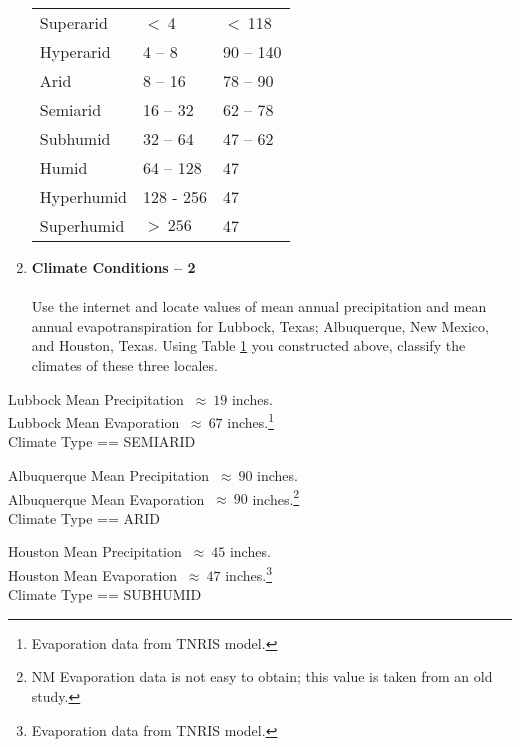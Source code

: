 \documentclass[12pt]{article}
\begin{document}
\begin{enumerate}
\begin{table}[htbp]
\begin{tabular}{p{1.5in}p{2.25in}p{2.25in}}
   Superarid & $<~$4 & $<~$118 \\

   Hyperarid & 4 -- 8  &  90 -- 140  \\
  
   Arid & 8 -- 16 &  78 -- 90 \\

   Semiarid & 16 -- 32 & 62 -- 78 \\

   Subhumid & 32 -- 64 & 47 -- 62 \\

   Humid & 64 -- 128 & 47  \\

   Hyperhumid & 128 - 256 & 47 \\

   Superhumid & $>~256$ & 47 \\

\hline
\hline
   \end{tabular}
   \label{tab:climate}
\end{table}

\item{{\textbf{Climate Conditions -- 2}}}~\\~\\
Use the internet and locate values of mean annual precipitation and mean annual evapotranspiration for Lubbock, Texas; Albuquerque, New Mexico, and Houston, Texas.   Using Table \ref{tab:climate} you constructed above, classify the climates of these three locales.
\end{enumerate}
Lubbock Mean Precipitation $~\approx~19$ inches. \\
Lubbock Mean Evaporation $~\approx~67$ inches.\footnote{Evaporation data from TNRIS model.}\\
Climate Type == SEMIARID

Albuquerque Mean Precipitation $~\approx~90$ inches. \\
Albuquerque Mean Evaporation $~\approx~90$ inches.\footnote{NM Evaporation data is not easy to obtain; this value is taken from an old study.}\\
Climate Type == ARID

Houston Mean Precipitation $~\approx~45$ inches. \\
Houston Mean Evaporation $~\approx~47$ inches.\footnote{Evaporation data from TNRIS model.}\\
Climate Type == SUBHUMID
\end{document}
